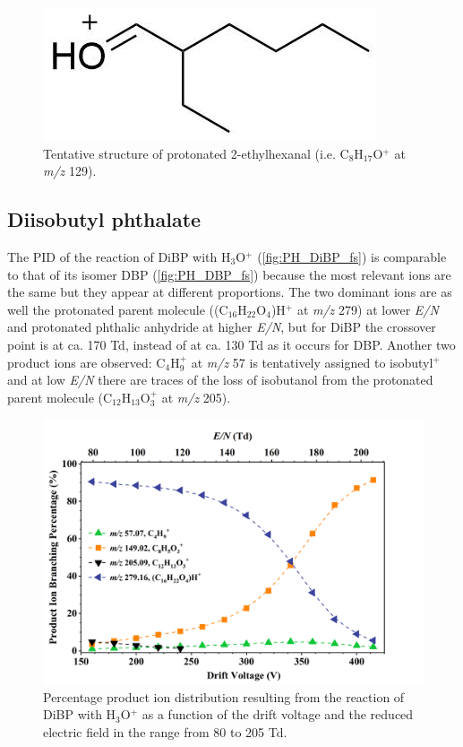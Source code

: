 \begin{figure}[htb]%
\centering
\includegraphics[height=0.05\textheight]{pics/PH/MEHP_frag.png}
\caption{Tentative structure of protonated 2-ethylhexanal (i.e. C$_8$H$_{17}$O$^+$ at \textit{m/z} 129).}
\label{fig:PH_MEHP_frag}
\end{figure}




\subsection{Diisobutyl phthalate}

The PID of the reaction of DiBP with H$_3$O$^+$ (\autoref{fig:PH_DiBP_fs}) is comparable to that of its isomer DBP (\autoref{fig:PH_DBP_fs}) because the most relevant ions are the same but they appear at different  proportions.
The two dominant ions are as well the protonated parent molecule ((C$_{16}$H$_{22}$O$_4$)H$^+$ at \textit{m/z} 279) at lower \textit{E/N} and protonated phthalic anhydride at higher \textit{E/N}, but for DiBP the crossover point is at ca. 170 Td, instead of at ca. 130 Td as it occurs for DBP.
Another two product ions are observed:  C$_4$H$_9^+$ at \textit{m/z} 57 is tentatively assigned to isobutyl$^+$ and 
at low \textit{E/N} there are traces of the loss of isobutanol from the protonated parent molecule (C$_{12}$H$_{13}$O$_3^+$ at \textit{m/z} 205).




\begin{figure}[htb]%
\centering
\includegraphics[height=0.35\textheight]{pics/DiBP-BR.png}
\caption{Percentage product ion distribution resulting from the reaction of DiBP with H$_3$O$^+$ as a function of the drift voltage and the reduced electric field in the range from 80 to 205 Td.}
\label{fig:PH_DiBP_fs}
\end{figure}





